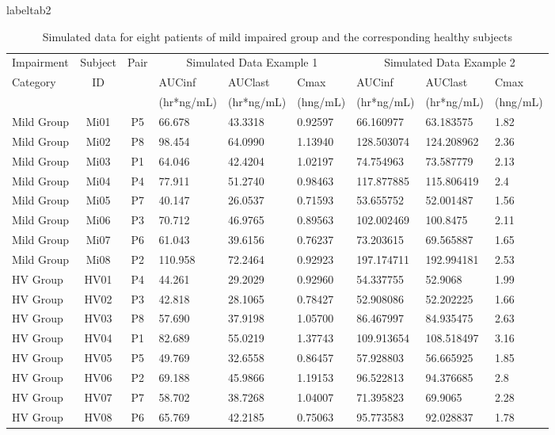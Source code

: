 \documentclass[final]{statistica}
\begin{document}
\FloatBarrier
\begin{table}
	\centering
	\caption{Simulated data for eight patients of mild impaired group and the corresponding healthy subjects}label{tab2}
	\begin{tabular}{|l|c|c|l|l|l|l|l|l|}
		\hline
		Impairment & Subject & Pair & \multicolumn{3}{c|}{Simulated Data Example 1} & \multicolumn{3}{c|}{Simulated Data Example 2} \\
		\cline{4-9}
		Category & ID & & AUCinf & AUClast & Cmax & AUCinf & AUClast & Cmax \\
		& & & (hr*ng/mL) & (hr*ng/mL) & (hng/mL) & (hr*ng/mL) & (hr*ng/mL) & (hng/mL) \\
		\hline
		Mild Group & Mi01 & P5 & 66.678 & 43.3318 & 0.92597 & 66.160977 & 63.183575 & 1.82 \\ \hline
		Mild Group & Mi02 & P8 & 98.454 & 64.0990 & 1.13940 & 128.503074 & 124.208962 & 2.36 \\ \hline
		Mild Group & Mi03 & P1 & 64.046 & 42.4204 & 1.02197 & 74.754963 & 73.587779 & 2.13 \\ \hline
		Mild Group & Mi04 & P4 & 77.911 & 51.2740 & 0.98463 & 117.877885 & 115.806419 & 2.4 \\ \hline
		Mild Group & Mi05 & P7 & 40.147 & 26.0537 & 0.71593 & 53.655752 & 52.001487 & 1.56 \\ \hline
		Mild Group & Mi06 & P3 & 70.712 & 46.9765 & 0.89563 & 102.002469 & 100.8475 & 2.11 \\ \hline
		Mild Group & Mi07 & P6 & 61.043 & 39.6156 & 0.76237 & 73.203615 & 69.565887 & 1.65 \\ \hline
		Mild Group & Mi08 & P2 & 110.958 & 72.2464 & 0.92923 & 197.174711 & 192.994181 & 2.53 \\ \hline
		HV Group & HV01 & P4 & 44.261 & 29.2029 & 0.92960 & 54.337755 & 52.9068 & 1.99 \\ \hline
		HV Group & HV02 & P3 & 42.818 & 28.1065 & 0.78427 & 52.908086 & 52.202225 & 1.66 \\ \hline
		HV Group & HV03 & P8 & 57.690 & 37.9198 & 1.05700 & 86.467997 & 84.935475 & 2.63 \\ \hline
		HV Group & HV04 & P1 & 82.689 & 55.0219 & 1.37743 & 109.913654 & 108.518497 & 3.16 \\ \hline
		HV Group & HV05 & P5 & 49.769 & 32.6558 & 0.86457 & 57.928803 & 56.665925 & 1.85 \\ \hline
		HV Group & HV06 & P2 & 69.188 & 45.9866 & 1.19153 & 96.522813 & 94.376685 & 2.8 \\ \hline
		HV Group & HV07 & P7 & 58.702 & 38.7268 & 1.04007 & 71.395823 & 69.9065 & 2.28 \\ \hline
		HV Group & HV08 & P6 & 65.769 & 42.2185 & 0.75063 & 95.773583 & 92.028837 & 1.78 \\
		\hline
	\end{tabular}
\end{table}
\end{document}

